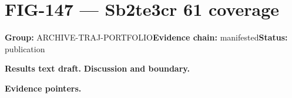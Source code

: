 \clearpage
\section{FIG-147 --- Sb2te3cr 61 coverage}
\label{figpage:fig-147}
\textbf{Group:} ARCHIVE-TRAJ-PORTFOLIO\quad \textbf{Evidence chain:} manifested\quad \textbf{Status:} publication

\textbf{Results text draft.} 
\textbf{Discussion and boundary.} 


\textbf{Evidence pointers.}



\vfill
